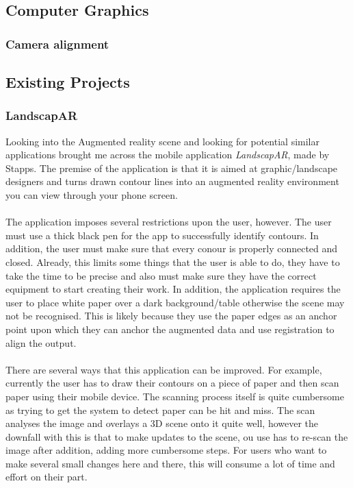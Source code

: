 \documentclass[11pt]{report}
\begin{document}
\subsection*{Computer Graphics}

\subsubsection*{Camera alignment}

\subsection*{Existing Projects}

\subsubsection*{LandscapAR}
Looking into the Augmented reality scene and looking for potential similar
applications brought me across the mobile application \textit{LandscapAR},
made by Stapps. The premise of the application is that it is aimed at
graphic/landscape designers and turns drawn contour lines into an augmented
reality environment you can view through your phone screen. \\
\\
The application imposes several restrictions upon the user, however. The user
must use a thick black pen for the app to successfully identify contours. 
In addition, the user must make sure that every conour is properly connected
and closed. Already, this limits some things that the user is able to do, they
have to take the time to be precise and also must make sure they have the 
correct equipment to start creating their work. In addition, the application
requires the user to place white paper over a dark background/table otherwise
the scene may not be recognised. This is likely because they use the paper
edges as an anchor point upon which they can anchor the augmented data and 
use registration to align the output. \\
\\
There are several ways that this application can be improved. For example,
currently the user has to draw their contours on a piece of paper and then
scan paper using their mobile device. The scanning process itself is quite 
cumbersome as trying to get the system to detect paper can be hit and miss.
The scan analyses the image and overlays a 3D scene onto it quite well, however
the downfall with this is that to make updates to the scene, ou use has to
re-scan the image after addition, adding more cumbersome steps. For users
who want to make several small changes here and there, this will consume a lot
of time and effort on their part.
\\
\end{document}
